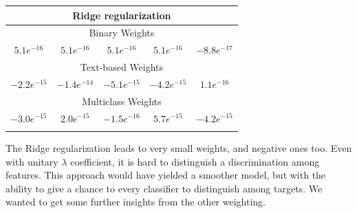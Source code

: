 \begin{center}
	\begin{tabular}{@{}ccccc@{}}
		\multicolumn{5}{c}{\textbf{Ridge regularization}}\\
		\hline\hline
		\multicolumn{5}{c}{Binary Weights}\\
		\hline
		\multicolumn{1}{c|}{$ 5.1e^{-16} $}&
		\multicolumn{1}{c|}{$ 5.1e^{-16} $}&
		\multicolumn{1}{c|}{$ 5.1e^{-16} $}&
		\multicolumn{1}{c|}{$ 5.1e^{-16} $}&
		\multicolumn{1}{c}{$ -8.8e^{-17} $}\\
		\hline
		\multicolumn{5}{c}{Text-based Weights}\\
		\hline
		\multicolumn{1}{c|}{$ -2.2e^{-15} $}&
		\multicolumn{1}{c|}{$ -1.4e^{-14} $}&
		\multicolumn{1}{c|}{$ -5.1e^{-15} $}&
		\multicolumn{1}{c|}{$ -4.2e^{-15} $}&
		\multicolumn{1}{c}{$ 1.1e^{-16} $}\\
		\hline
		\multicolumn{5}{c}{Multiclass Weights}\\
		\hline
		\multicolumn{1}{c|}{$ -3.0e^{-15} $}&
		\multicolumn{1}{c|}{$ 2.0e^{-15} $}&
		\multicolumn{1}{c|}{$ -1.5e^{-16} $}&
		\multicolumn{1}{c|}{$ 5.7e^{-15} $}&
		\multicolumn{1}{c|}{$ -4.2e^{-15} $}\\
		\hline\hline\\
	\end{tabular}
\end{center}
The Ridge regularization leads to very small weights, and negative ones too. Even with unitary $ \lambda  $ coefficient, it is hard to distinguish a discrimination among features. This approach would have yielded a smoother model, but with the ability to give a chance to every classifier to distinguish among targets.
We wanted to get some further insights from the other weighting.

